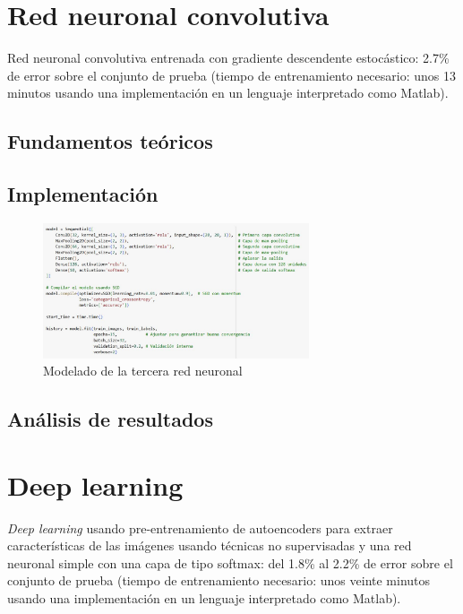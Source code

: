 \section{Red neuronal convolutiva}

Red neuronal convolutiva entrenada con gradiente descendente estocástico: 2.7\%
de error sobre el conjunto de prueba (tiempo de entrenamiento necesario: unos 13
minutos usando una implementación en un lenguaje interpretado como Matlab).

\subsection{Fundamentos teóricos}

\subsection{Implementación}

\begin{figure}[H]
	\centering
	\includegraphics[width=0.7\textwidth]{imgs/model-red3.JPG}
	\caption{Modelado de la tercera red neuronal}
	\label{fig:model-red3}
\end{figure}

\subsection{Análisis de resultados}



\section{Deep learning}

\textit{Deep learning} usando pre-entrenamiento de autoencoders para extraer características de las imágenes usando técnicas no supervisadas y una red neuronal simple con una capa de tipo softmax: del 1.8\% al 2.2\% de error sobre el conjunto de prueba (tiempo de entrenamiento necesario: unos veinte minutos usando una implementación en un lenguaje interpretado como Matlab).

